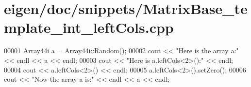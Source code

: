 \hypertarget{eigen_2doc_2snippets_2_matrix_base__template__int__left_cols_8cpp_source}{}\section{eigen/doc/snippets/\+Matrix\+Base\+\_\+template\+\_\+int\+\_\+left\+Cols.cpp}
\label{eigen_2doc_2snippets_2_matrix_base__template__int__left_cols_8cpp_source}

\begin{DoxyCode}
00001 Array44i a = Array44i::Random();
00002 cout << \textcolor{stringliteral}{"Here is the array a:"} << endl << a << endl;
00003 cout << \textcolor{stringliteral}{"Here is a.leftCols<2>():"} << endl;
00004 cout << a.leftCols<2>() << endl;
00005 a.leftCols<2>().setZero();
00006 cout << \textcolor{stringliteral}{"Now the array a is:"} << endl << a << endl;
\end{DoxyCode}
